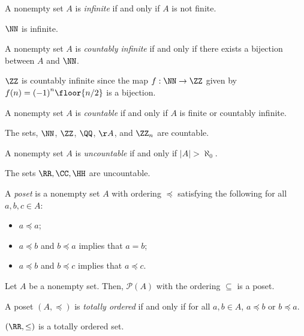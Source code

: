 \begin{definition*}
	A nonempty set $A$ is \textit{infinite} if and only if $A$ is not finite.
\end{definition*}
\begin{example*}
	$\NN$ is infinite.
\end{example*}

\begin{definition*}
	A nonempty set $A$ is \textit{countably infinite} if and only if there exists a bijection between $A$ and $\NN$.
\end{definition*}
\begin{example*}
	$\ZZ$ is countably infinite since the map $f:\NN\rightarrow\ZZ$ given by $f(n)={(-1)}^n\floor{n/2}$ is a bijection.
\end{example*}

\begin{definition*}
	A nonempty set $A$ is \textit{countable} if and only if $A$ is finite or countably infinite.
\end{definition*}
\begin{example*}
	The sets, $\NN$, $\ZZ$, $\QQ$, $\AA$, and $\ZZ_n$ are countable.
\end{example*}

\begin{definition*}
	A nonempty set $A$ is \textit{uncountable} if and only if $|A|>\aleph_0$.
\end{definition*}
\begin{example*}
	The sets $\RR,\CC,\HH$ are uncountable.
\end{example*}

\begin{definition*}
	A \textit{poset} is a nonempty set $A$ with ordering $\preceq$ satisfying the following for all $a,b,c\in A$:
	\begin{itemize}
		\item $a\preceq a$;
		\item $a\preceq b$ and $b\preceq a$ implies that $a=b$;
		\item $a\preceq b$ and $b\preceq c$ implies that $a\preceq c$.
	\end{itemize}
\end{definition*}
\begin{example*}
	Let $A$ be a nonempty set.
	Then, $\mathcal{P}(A)$ with the ordering $\subseteq$ is a poset.
\end{example*}

\begin{definition*}
	A poset $(A,\preceq)$ is \textit{totally ordered} if and only if for all $a,b\in A$, $a\preceq b$ or $b\preceq a$.
\end{definition*}
\begin{example*}
	$(\RR, \leq)$ is a totally ordered set.
\end{example*}

